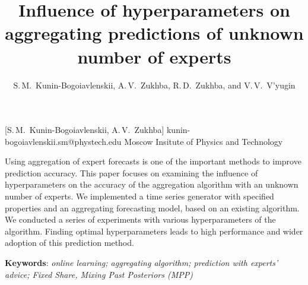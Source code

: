 \documentclass[12pt, twoside]{article}
\begin{document}
\English

\title
	[My first scientific paper] %
    {Influence of hyperparameters on aggregating predictions of unknown number of experts} %
\author
	[S.\,M.~Kunin-Bogoiavlenskii] %
	{S.\,M.~Kunin-Bogoiavlenskii, A.\,V.~Zukhba, R.\,D.~Zukhba, and V.\,V.~V’yugin} %
    [S.\,M.~Kunin-Bogoiavlenskii, A.\,V.~Zukhba] %
\email
    {kunin-bogoiavlenskii.sm@phystech.edu}
\organization
    {Moscow Insitute of Physics and Technology}
\abstract
    {
    
	Using aggregation of expert forecasts is one of the important methods to improve prediction accuracy. 
	This paper focuses on examining the influence of hyperparameters on the accuracy of the aggregation algorithm with an unknown number of experts.
	We implemented a time series generator with specified properties and an aggregating forecasting model, based on an existing algorithm. 
	We conducted a series of experiments with various hyperparameters of the algorithm.
	Finding optimal hyperparameters leads to high performance and wider adoption of this prediction method.
	    	
%	
%	
%	
%				
	\noindent
    	\textbf{Keywords}: \emph{online learning; aggregating algorithm; prediction with experts’ advice; Fixed Share, Mixing Past Posteriors (MPP)}}

\end{document}
